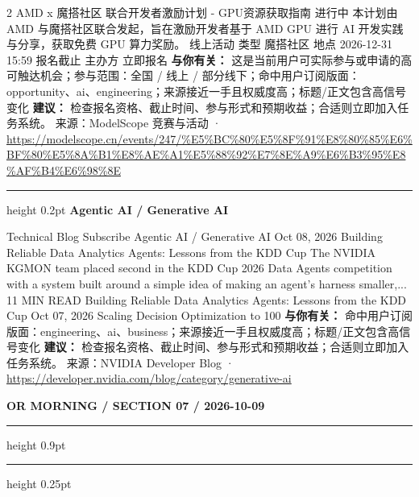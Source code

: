 \documentclass[10.5pt]{ctexart}
\begin{document}
\begin{multicols}{2}
AMD x 魔搭社区 联合开发者激励计划 - GPU资源获取指南 进行中 本计划由 AMD 与魔搭社区联合发起，旨在激励开发者基于 AMD GPU 进行 AI 开发实践与分享，获取免费 GPU 算力奖励。 线上活动 类型 魔搭社区 地点 2026-12-31 15:59 报名截止 主办方 立即报名
\textbf{与你有关：} 这是当前用户可实际参与或申请的高可触达机会；参与范围：全国 / 线上 / 部分线下；命中用户订阅版面：opportunity、ai、engineering；来源接近一手且权威度高；标题/正文包含高信号变化
\textbf{建议：} 检查报名资格、截止时间、参与形式和预期收益；合适则立即加入任务系统。
{\footnotesize\color{ormuted} 来源：ModelScope 竞赛与活动 · \url{https://modelscope.cn/events/247/%E5%BC%80%E5%8F%91%E8%80%85%E6%BF%80%E5%8A%B1%E8%AE%A1%E5%88%92%E7%8E%A9%E6%B3%95%E8%AF%B4%E6%98%8E}}
\vspace{2mm}
\hrule height 0.2pt
\vspace{2mm}
{\large\bfseries Agentic AI / Generative AI}\par
Technical Blog Subscribe Agentic AI / Generative AI Oct 08, 2026 Building Reliable Data Analytics Agents: Lessons from the KDD Cup The NVIDIA KGMON team placed second in the KDD Cup 2026 Data Agents competition with a system built around a simple idea of making an agent's harness smaller,... 11 MIN READ Building Reliable Data Analytics Agents: Lessons from the KDD Cup Oct 07, 2026 Scaling Decision Optimization to 100
\textbf{与你有关：} 命中用户订阅版面：engineering、ai、business；来源接近一手且权威度高；标题/正文包含高信号变化
\textbf{建议：} 检查报名资格、截止时间、参与形式和预期收益；合适则立即加入任务系统。
{\footnotesize\color{ormuted} 来源：NVIDIA Developer Blog · \url{https://developer.nvidia.com/blog/category/generative-ai}}
\end{multicols}
\newpage
{\small\bfseries OR MORNING / SECTION 07 / 2026-10-09}
\vspace{2mm}
\hrule height 0.9pt
\vspace{1.5mm}
\hrule height 0.25pt
\vspace{4mm}
\end{document}
